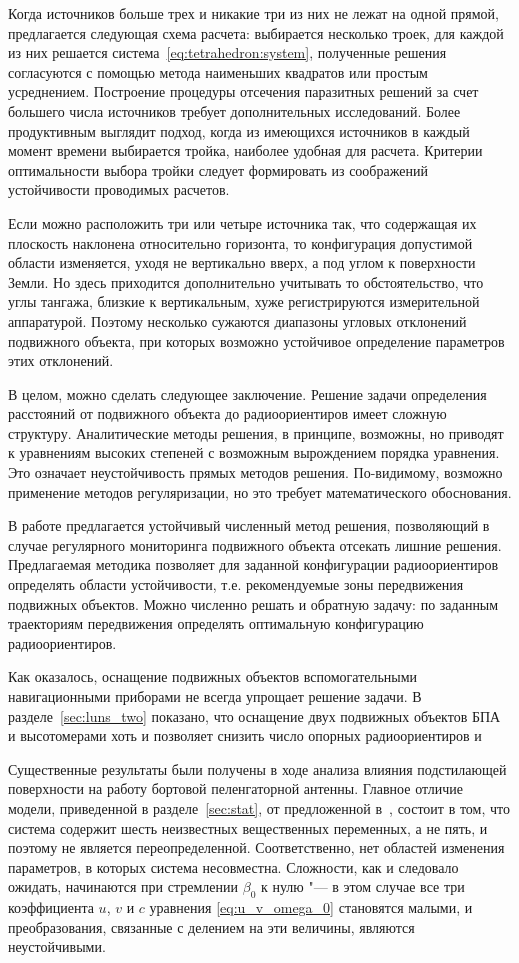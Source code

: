\documentclass[../main.tex]{subfiles}
\begin{document}
Когда источников больше трех и никакие три из них не лежат на одной прямой, предлагается следующая схема расчета: выбирается несколько троек, для каждой из них решается система~\eqref{eq:tetrahedron:system}, полученные решения согласуются с помощью метода наименьших квадратов или простым усреднением. Построение процедуры отсечения паразитных решений за счет большего числа источников требует дополнительных исследований. Более продуктивным выглядит подход, когда из имеющихся источников в каждый момент времени выбирается тройка, наиболее удобная для расчета. Критерии оптимальности выбора тройки следует формировать из соображений устойчивости проводимых расчетов.

Если можно расположить три или четыре источника так, что содержащая их плоскость наклонена относительно горизонта, то конфигурация допустимой области изменяется, уходя не вертикально вверх, а под углом к поверхности Земли. Но здесь приходится дополнительно учитывать то обстоятельство, что углы тангажа, близкие к вертикальным, хуже регистрируются измерительной аппаратурой. Поэтому несколько сужаются диапазоны угловых отклонений подвижного объекта, при которых возможно устойчивое определение параметров этих отклонений.

В целом, можно сделать следующее заключение. Решение задачи определения расстояний от подвижного объекта до радиоориентиров имеет сложную структуру. Аналитические методы решения, в принципе, возможны, но приводят к уравнениям высоких степеней с возможным вырождением порядка уравнения. Это означает неустойчивость прямых методов решения. По-видимому, возможно применение методов регуляризации, но это требует математического обоснования.

В работе предлагается устойчивый численный метод решения, позволяющий в случае регулярного мониторинга подвижного объекта отсекать лишние решения. Предлагаемая методика позволяет для заданной конфигурации радиоориентиров определять области устойчивости, т.е. рекомендуемые зоны передвижения подвижных объектов. Можно численно решать и обратную задачу: по заданным траекториям передвижения определять оптимальную конфигурацию радиоориентиров.

Как оказалось, оснащение подвижных объектов вспомогательными навигационными приборами не всегда упрощает решение задачи. В разделе~\ref{sec:luns_two} показано, что оснащение двух подвижных объектов БПА и высотомерами хоть и позволяет снизить число опорных радиоориентиров и

Существенные результаты были получены в ходе анализа влияния подстилающей поверхности на работу бортовой пеленгаторной антенны. Главное отличие модели, приведенной в разделе~\ref{sec:stat}, от предложенной в~\cite{VINOGRADOV:2017}, состоит в том, что система содержит шесть неизвестных вещественных переменных, а не пять, и поэтому не является переопределенной. Соответственно, нет областей изменения параметров, в которых система несовместна. Сложности, как и следовало ожидать, начинаются при стремлении $\beta_0$ к нулю "--- в этом случае все три коэффициента $u$, $v$ и $c$ уравнения \eqref{eq:u_v_omega_0} становятся малыми, и преобразования, связанные с делением на эти величины, являются неустойчивыми.
\end{document}
